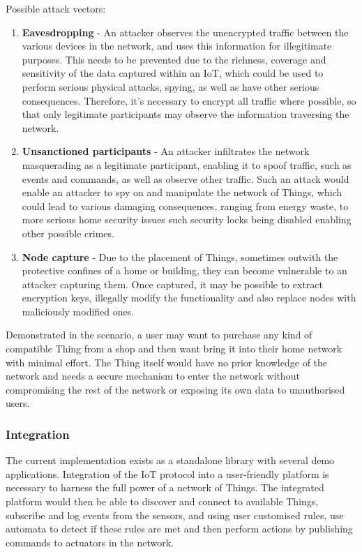 \documentclass{mprop}
\begin{document}
Possible attack vectors:
\begin{enumerate}
  \item \textbf{Eavesdropping} - An attacker observes the unencrypted traffic between the various devices in the network, and uses this information for illegitimate purposes. This needs to be prevented due to the richness, coverage and sensitivity of the data captured within an IoT, which could be used to perform serious physical attacks, spying, as well as have other serious consequences. Therefore, it's necessary to encrypt all traffic where possible, so that only legitimate participants may observe the information traversing the network.
  \item \textbf{Unsanctioned participants} - An attacker infiltrates the network masquerading as a legitimate participant, enabling it to spoof traffic, such as events and commands, as well as observe other traffic. Such an attack would enable an attacker to spy on and manipulate the network of Things, which could lead to various damaging consequences, ranging from energy waste, to more serious home security issues such security locks being disabled enabling other possible crimes.
  \item \textbf{Node capture} - Due to the placement of Things, sometimes outwith the protective confines of a home or building, they can become vulnerable to an attacker capturing them. Once captured, it may be possible to extract encryption keys, illegally modify the functionality and also replace nodes with maliciously modified ones.
\end{enumerate}

Demonstrated in the scenario, a user may want to purchase any kind of compatible Thing from a shop and then want bring it into their home network with minimal effort. The Thing itself would have no prior knowledge of the network and needs a secure mechanism to enter the network without compromising the rest of the network or exposing its own data to unauthorised users. 

\subsubsection{Integration} %
\label{ssub:integration}

The current implementation exists as a standalone library with several demo applications. Integration of the IoT protocol into a user-friendly platform is necessary to harness the full power of a network of Things. The integrated platform would then be able to discover and connect to available Things, subscribe and log events from the sensors, and using user customised rules, use automata to detect if these rules are met and then perform actions by publishing commands to actuators in the network.
\end{document}
